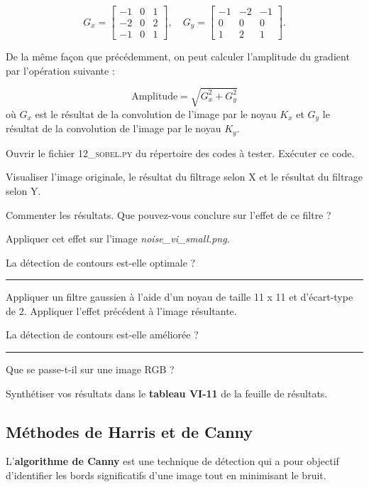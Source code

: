 $$G_x = \begin{bmatrix}
-1 & 0 & 1 \\
-2 & 0 & 2 \\
-1 & 0 & 1 
\end{bmatrix},
\quad
G_y =
\begin{bmatrix}
-1 & -2 & -1 \\
0 & 0 & 0 \\
1 & 2 & 1 
\end{bmatrix}.
$$


\newpage
De la même façon que précédemment, on peut calculer l'amplitude du gradient par l'opération suivante : 

$$\text{Amplitude} = \sqrt{G_x^2 + G_y^2}$$ où $G_x$ est le résultat de la convolution de l'image par le noyau $K_x$ et $G_y$ le résultat de la convolution de l'image par le noyau $K_y$.

\medskip

\Manip Ouvrir le fichier \textsc{12\_sobel.py} du répertoire des codes à tester. Exécuter ce code.

\Manip Visualiser l'image originale, le résultat du filtrage selon X et le résultat du filtrage selon Y.

\Quest Commenter les résultats. Que pouvez-vous conclure sur l'effet de ce filtre ?

\Manip Appliquer cet effet sur l'image \textsl{noise\_vi\_small.png}.

\Quest La détection de contours est-elle optimale ?

\noindent \rule{\linewidth}{1pt}

\Manip Appliquer un filtre gaussien à l'aide d'un noyau de taille 11 x 11 et d'écart-type de 2. Appliquer l'effet précédent à l'image résultante.

\Quest La détection de contours est-elle améliorée ?

\noindent \rule{\linewidth}{1pt}

\Quest Que se passe-t-il sur une image RGB ? 

\Manip Synthétiser vos résultats dans le \textbf{tableau VI-11} de la feuille de résultats. 

\subsection{Méthodes de Harris et de Canny}

L'\textbf{algorithme de Canny} est une technique de détection qui a pour objectif d'identifier les bords significatifs d'une image tout en minimisant le bruit.

